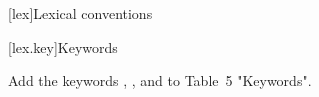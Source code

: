 
[lex]{Lexical conventions}

\setcounter{section}{10}
[lex.key]{Keywords}

Add the keywords , , and
 to Table~5 "Keywords".

